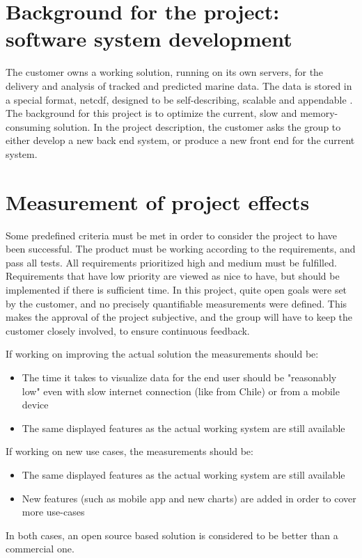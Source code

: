 \documentclass[11pt,a4paper,titlepage,oneside]{report}
\begin{document}
\section{Background for the project: software system development}
The customer owns a working solution, running on its own servers, for the delivery and analysis of  tracked and predicted marine data. The data is stored in a special format, \gls{netcdf}, designed to be self-describing, scalable and appendable \cite{netCDF:factsheet}.
The background for this project is to optimize the current, slow and memory-consuming solution. In the project description, the customer asks the group to either develop a new back end system, or produce a new front end for the current system. 

\section{Measurement of project effects}
Some predefined criteria must be met in order to consider the project to have been successful. The product must be working according to the requirements, and pass all tests. All requirements prioritized high and medium must be fulfilled. Requirements that have low priority are viewed as nice to have, but should be implemented if there is sufficient time.
In this project, quite open goals were set by the customer, and no precisely quantifiable measurements were defined. This makes the approval of the project subjective, and the group will have to keep the customer closely involved, to ensure continuous feedback.

If working on improving the actual solution the measurements should be:
\begin{itemize}
\item The time it takes to visualize data for the end user should be "reasonably low" even with slow internet connection (like from Chile) or from a mobile device
\item The same displayed features as the actual working system are still available
\end{itemize}

If working on new use cases, the measurements should be:
\begin{itemize}
\item The same displayed features as the actual working system are still available
\item New features (such as mobile app and new charts) are added in order to cover more use-cases 
\end{itemize}
In both cases, an open source based solution is considered to be better than a commercial one.
\end{document}
